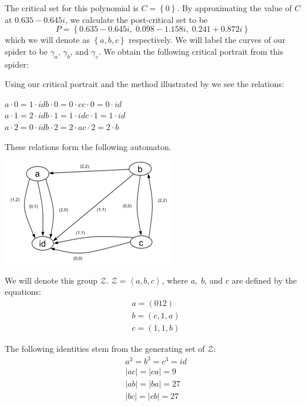 \documentclass[11pt]{amsart}
\theoremstyle{definition}
\theoremstyle{remark}
\numberwithin{equation}{section}
\begin{document}
The critical set for this polynomial is $C=\left\{0\right\}$.  By approximating the value of $C$ at $0.635-0.645i$, we calculate the post-critical set to be $$P=\left\{0.635-0.645i,\;0.098-1.158i,\;0.241+0.872i\right\}$$ which we will denote as $\left\{a,b,c\right\}$ respectively.  We will label the curves of our spider to be $\gamma_a$, $\gamma_b$, and $\gamma_c$.  We obtain the following critical portrait from this spider: 


Using our critical portrait and the method illustrated by \cite{Nekr} we see the relations:
\begin{center}
$a\cdot0=1\cdot id$\hspace{2cm}$b\cdot0=0\cdot c$\hspace{2cm}$c\cdot0=0\cdot id$\\
$a\cdot1=2\cdot id$\hspace{2cm}$b\cdot1=1\cdot id$\hspace{1.82cm}$c\cdot1=1\cdot id$\\
$a\cdot2=0\cdot id$\hspace{2cm}$b\cdot2=2\cdot a$\hspace{1.95cm}$c\cdot2=2\cdot b$\\
\end{center}
These relations form the following automaton.\\

\begin{center}
\includegraphics[scale=0.9]{aaronautomaton.png}
\end{center}

We will denote this group $\mathcal{Z}$.   $\mathcal{Z}=\left\langle a,b,c\right\rangle$, where $a,\;b$, and $c$ are defined by the equations:
\begin{align*}
& a=(012)\\ 
& b=(c,1,a)\\
& c=(1,1,b)
\end{align*}

The following identities stem from the generating set of $\mathcal{Z}$:
\begin{align*}
& a^3=b^3=c^3=id\\
& \left|ac\right|=\left|ca\right|=9\\
& \left|ab\right|=\left|ba\right|=27\\
& \left|bc\right|=\left|cb\right|=27\\
\end{align*}
\end{document}

